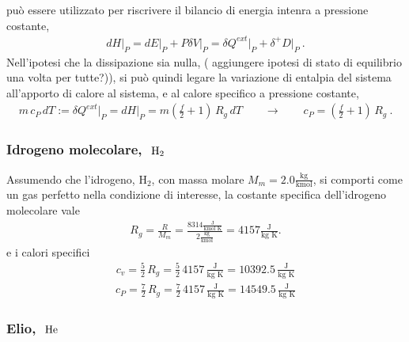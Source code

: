 \documentclass[letterpaper,10pt,italian]{jupyterBook}
\begin{document}
\sphinxAtStartPar
può essere utilizzato per riscrivere il bilancio di energia intenra a pressione costante,
\begin{equation*}
\begin{split}dH\big|_P = dE\big|_P + P \delta V\big|_P = \delta Q^{ext}\big|_P + \delta^+ D\big|_P \ .\end{split}
\end{equation*}
\sphinxAtStartPar
Nell’ipotesi che la dissipazione sia nulla, ( aggiungere ipotesi di stato di equilibrio una volta per tutte?)), si può quindi legare la variazione di entalpia del sistema all’apporto di calore al sistema, e al calore specifico a pressione costante,
\begin{equation*}
\begin{split}m \, c_P \, dT := \delta Q^{ext}\big|_P = d H \big|_P = m \left( \frac{f}{2} + 1 \right) \, R_g \, d T 
\qquad \rightarrow \qquad
c_P = \left( \frac{f}{2} + 1 \right) \, R_g \ .\end{split}
\end{equation*}
\sphinxAtStartPar
{}
\subsubsection*{Idrogeno molecolare, \protect\(\text{ H}_2\protect\)}

\sphinxAtStartPar
Assumendo che l’idrogeno, \(\text{H}_2\), con massa molare \(M_m = 2.0 \frac{\text{kg}}{\text{kmol}}\), si comporti come un gas perfetto nella condizione di interesse, la costante specifica dell’idrogeno molecolare vale
\begin{equation*}
\begin{split}R_g = \frac{R}{M_m} = \frac{8314 \frac{\text{J}}{\text{kmol} \text{ K}}}{2 \frac{\text{kg}}{\text{kmol}}} = 4157 \frac{\text{J}}{\text{kg} \text{ K}} .\end{split}
\end{equation*}
\sphinxAtStartPar
e i calori specifici
\begin{equation*}
\begin{split}c_v = \frac{5}{2} \, R_g = \frac{5}{2} \, 4157 \, \frac{\text{J}}{\text{kg} \text{ K}} = 10392.5 \, \frac{\text{J}}{\text{kg} \text{ K}} \end{split}
\end{equation*}\begin{equation*}
\begin{split}c_P = \frac{7}{2} \, R_g = \frac{7}{2} \, 4157 \, \frac{\text{J}}{\text{kg} \text{ K}} = 14549.5 \, \frac{\text{J}}{\text{kg} \text{ K}} \end{split}
\end{equation*}\subsubsection*{Elio, \protect\(\text{ He}\protect\)}
\end{document}
